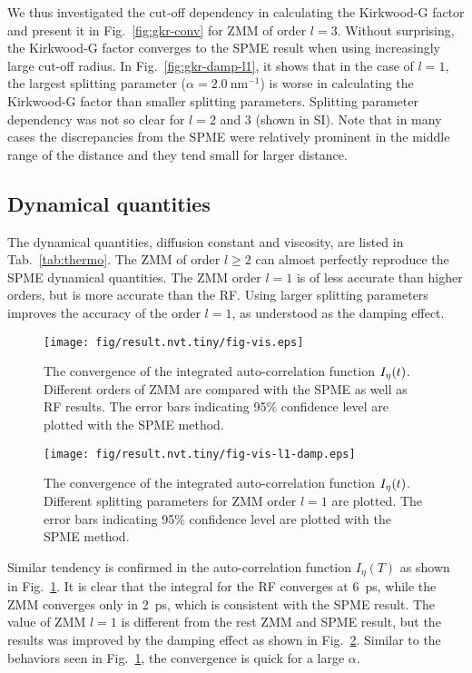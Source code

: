 \documentclass[a4paper,preprint,unsortedaddress,onecolumn,fleqn]{revtex4}
\begin{document}
We thus investigated the cut-off dependency in calculating the Kirkwood-G
factor and present it in Fig.~\ref{fig:gkr-conv} for ZMM of order $l=3$.
Without surprising, the Kirkwood-G factor converges to the SPME result when
using increasingly large cut-off radius. In Fig.~\ref{fig:gkr-damp-l1}, it
shows that in the case of $l=1$, the largest splitting parameter ($\alpha
=2.0\ \text{nm}^{-1}$) is worse in calculating the Kirkwood-G factor than
smaller splitting parameters. Splitting parameter dependency was not so
clear for $l=2$ and 3 (shown in SI). Note that in many cases the
discrepancies from the SPME were relatively prominent in the middle range of
the distance and they tend small for larger distance.

\subsection{Dynamical quantities}

The dynamical quantities, diffusion constant and viscosity, are listed in
Tab.~\ref{tab:thermo}. The ZMM of order $l\geq 2$ can almost perfectly
reproduce the SPME dynamical quantities. The ZMM order $l=1$ is of less
accurate than higher orders, but is more accurate than the RF. Using larger
splitting parameters improves the accuracy of the order $l=1$, as understood
as the damping effect.

\begin{figure}[tbp]
\centering
\texttt{[image: fig/result.nvt.tiny/fig-vis.eps]}
\caption{The convergence of the integrated auto-correlation function $I_{%
\protect\eta }(t)$. Different orders of ZMM are compared with the SPME as
well as RF results. The error bars indicating 95\% confidence level are
plotted with the SPME method. }
\label{fig:conv-vis}
\end{figure}

\begin{figure}[tbp]
\centering
\texttt{[image: fig/result.nvt.tiny/fig-vis-l1-damp.eps]}
\caption{The convergence of the integrated auto-correlation function $I_{%
\protect\eta }(t)$. Different splitting parameters for ZMM order $l=1$ are
plotted. The error bars indicating 95\% confidence level are plotted with
the SPME method. }
\label{fig:conv-vis-damp}
\end{figure}

Similar tendency is confirmed in the auto-correlation function $I_{\eta }(T)$
as shown in Fig.~\ref{fig:conv-vis}. It is clear that the integral for the
RF converges at 6~ps, while the ZMM converges only in 2~ps, which is
consistent with the SPME result. The value of ZMM $l=1$ is different from
the rest ZMM and SPME result, but the results was improved by the damping
effect as shown in Fig.~\ref{fig:conv-vis-damp}. Similar to the behaviors
seen in Fig.~\ref{fig:conv-vis}, the convergence is quick for a large $%
\alpha $.
\end{document}
